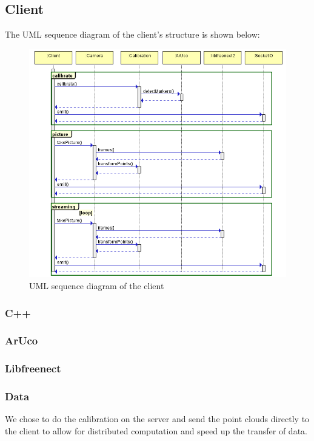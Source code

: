 \documentclass{article}
\begin{document}
\subsection{Client}
The UML sequence diagram of the client's structure is shown below:
\begin{figure}[h]
  \centering
  \includegraphics[scale=0.7]{clientUML}
  \caption{UML sequence diagram of the client}
\end{figure}
\subsubsection{C++}
\subsubsection{ArUco}
\subsubsection{Libfreenect}
\subsubsection{Data}
We chose to do the calibration on the server and send the point clouds directly to the client to allow for distributed computation and speed up the transfer of data.
\end{document}
